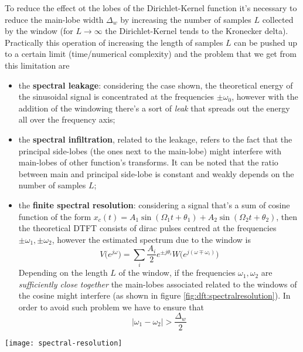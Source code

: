 		To reduce the effect ot the lobes of the Dirichlet-Kernel function it's necessary to reduce the main-lobe width $\Delta_w$ by increasing the number of samples $L$ collected by the window (for $L\rightarrow \infty$ the Dirichlet-Kernel tends to the Kronecker delta). Practically this operation of increasing the length of samples $L$ can be pushed up to a certain limit (time/numerical complexity) and the problem that we get from this limitation are
		\begin{itemize}
			\item the \textbf{spectral leakage}: considering the case shown, the theoretical energy of the sinusoidal signal is concentrated at the frequencies $\pm\omega_0$, however with the addition of the windowing there's a sort of \textit{leak} that spreads out the energy all over the frequency axis;
			
			\item the \textbf{spectral infiltration}, related to the leakage, refers to the fact that the principal side-lobes (the ones next to the main-lobe) might interfere with main-lobes of other function's transforms. It can be noted that the ratio between main and principal side-lobe is constant and weakly depends on the number of samples $L$;
			
			\item the \textbf{finite spectral resolution}: considering a signal that's a sum of cosine function of the form $x_c(t) = A_1 \sin(\Omega_1t + \theta_1) + A_2 \sin(\Omega_2t+\theta_2)$, then the theoretical DTFT consists of dirac pulses centred at the frequencies $\pm \omega_1,\pm \omega_2$, however the estimated spectrum due to the window is
			\[ V \big(e^{j\omega}\big) = \sum_i \frac{A_i}{2} e^{\pm j\theta_i} W\Big( e^{j(\omega \mp \omega_i)} \Big) \]
			Depending on the length $L$ of the window, if the frequencies $\omega_1,\omega_2$ are \textit{sufficiently close together} the main-lobes associated related to the windows of the cosine might interfere (as shown in figure \ref{fig:dft:spectralresolution}). In order to avoid such problem we have to ensure that
			\[ |\omega_1-\omega_2| > \frac{\Delta_w}{2} \]
			
		\end{itemize}
	
		\begin{SCfigure}[2][bht]
			\centering \texttt{[image: spectral-resolution]}
			\caption{estimated spectrum of a signal $ A_1 \sin(\Omega_1t + \theta_1) + A_2 \sin(\Omega_2t + \theta_2)$ where the difference $\omega_1-\omega_2$ is "big" and so the spectral leakage can be neglected (upper) and the case on which the frequencies are "sufficiently close" (lower) considering the problem of the spectral resolution.} \label{fig:dft:spectralresolution}
		\end{SCfigure}
	
